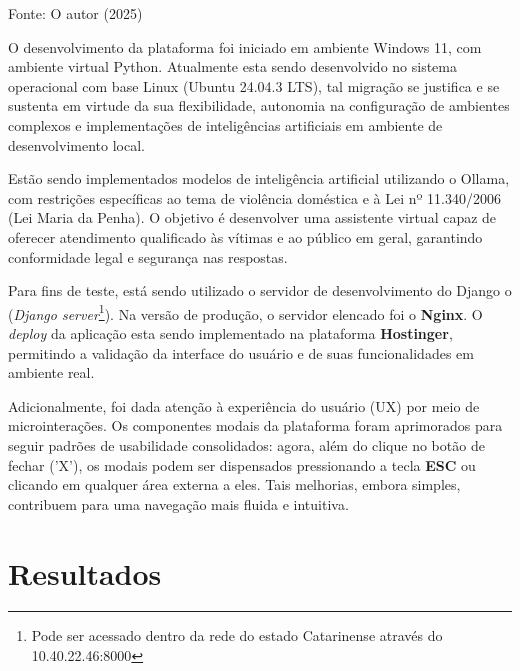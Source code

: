 \begin{algorithm}[H]
    
   

   {\fontsize{10pt}{\baselineskip}\selectfont
   Fonte: O autor (2025)}
\end{algorithm}

\par O desenvolvimento da plataforma foi iniciado em ambiente Windows 11, com ambiente virtual Python. Atualmente esta sendo desenvolvido no sistema operacional com base Linux (Ubuntu 24.04.3 LTS), tal migração se justifica e se sustenta em virtude da sua flexibilidade, autonomia na configuração de ambientes complexos e implementações de inteligências artificiais em ambiente de desenvolvimento local.

\par Estão sendo implementados modelos de inteligência artificial utilizando o Ollama, com restrições específicas ao tema de violência doméstica e à Lei nº 11.340/2006 (Lei Maria da Penha). O objetivo é desenvolver uma assistente virtual capaz de oferecer atendimento qualificado às vítimas e ao público em geral, garantindo conformidade legal e segurança nas respostas.

\par Para fins de teste, está sendo utilizado o servidor de desenvolvimento do Django o (\textit{Django server}\footnote{Pode ser acessado dentro da rede do estado Catarinense através do 10.40.22.46:8000}). Na versão de produção, o servidor elencado foi o \textbf{Nginx}. O \textit{deploy} da aplicação esta sendo implementado na plataforma \textbf{Hostinger}, permitindo a validação da interface do usuário e de suas funcionalidades em ambiente real.

\par Adicionalmente, foi dada atenção à experiência do usuário (UX) por meio de microinterações. Os componentes modais da plataforma foram aprimorados para seguir padrões de usabilidade consolidados: agora, além do clique no botão de fechar ('X'), os modais podem ser dispensados pressionando a tecla \textbf{ESC} ou clicando em qualquer área externa a eles. Tais melhorias, embora simples, contribuem para uma navegação mais fluida e intuitiva.

\section{Resultados}

